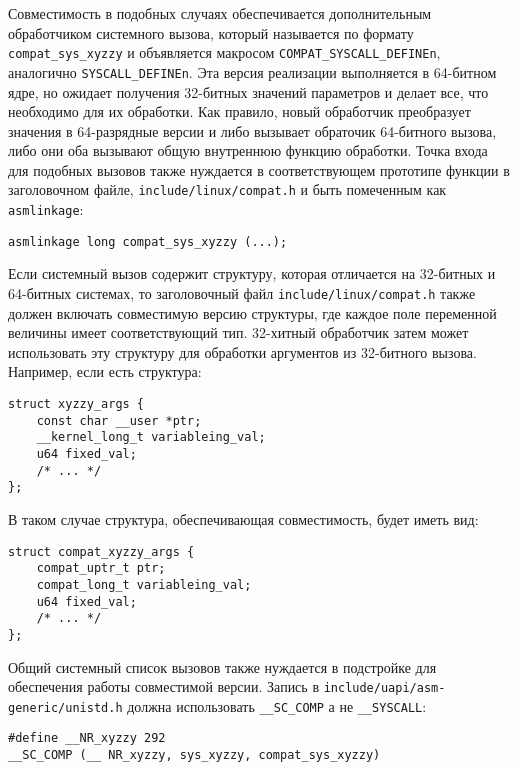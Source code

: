 Совместимость в подобных случаях обеспечивается дополнительным обработчиком
системного вызова, который называется по формату \texttt{compat\_sys\_xyzzy} и
объявляется макросом \texttt{COMPAT\_SYSCALL\_DEFINEn}, аналогично
\texttt{SYSCALL\_DEFINEn}. Эта версия реализации выполняется в 64-битном ядре,
но ожидает получения 32-битных значений параметров и делает все, что необходимо
для их обработки. Как правило, новый обработчик преобразует значения в
64-разрядные версии и либо вызывает обраточик 64-битного вызова, либо они оба
вызывают общую внутреннюю функцию обработки. Точка входа для подобных вызовов
также нуждается в соответствующем прототипе функции в заголовочном файле,
\texttt{include/linux/compat.h} и быть помеченным как \texttt{asmlinkage}:

\medskip
\begin{lstlisting}[style=cstyle]
asmlinkage long compat_sys_xyzzy (...);
\end{lstlisting}
\medskip

Если системный вызов содержит структуру, которая отличается на 32-битных и
64-битных системах, то заголовочный файл \texttt{include/linux/compat.h} также
должен включать совместимую версию структуры, где каждое поле переменной
величины имеет соответствующий тип. 32-хитный обработчик затем может
использовать эту структуру для обработки аргументов из 32-битного вызова.
Например, если есть структура:

\medskip
\begin{lstlisting}[style=cstyle]
struct xyzzy_args {
	const char __user *ptr;
	__kernel_long_t variableing_val;
	u64 fixed_val;
	/* ... */
};
\end{lstlisting}
\medskip

В таком случае структура, обеспечивающая совместимость, будет иметь вид:

\medskip
\begin{lstlisting}[style=cstyle]
struct compat_xyzzy_args {
	compat_uptr_t ptr;
	compat_long_t variableing_val;
	u64 fixed_val;
	/* ... */
};
\end{lstlisting}
\medskip

Общий системный список вызовов также нуждается в подстройке для обеспечения
работы совместимой версии. Запись в \texttt{include/uapi/asm-generic/unistd.h}
должна использовать \texttt{\_\_SC\_COMP} а не \texttt{\_\_SYSCALL}:

\medskip
\begin{lstlisting}[style=cstyle]
#define __NR_xyzzy 292
__SC_COMP (__ NR_xyzzy, sys_xyzzy, compat_sys_xyzzy)
\end{lstlisting}
\medskip

